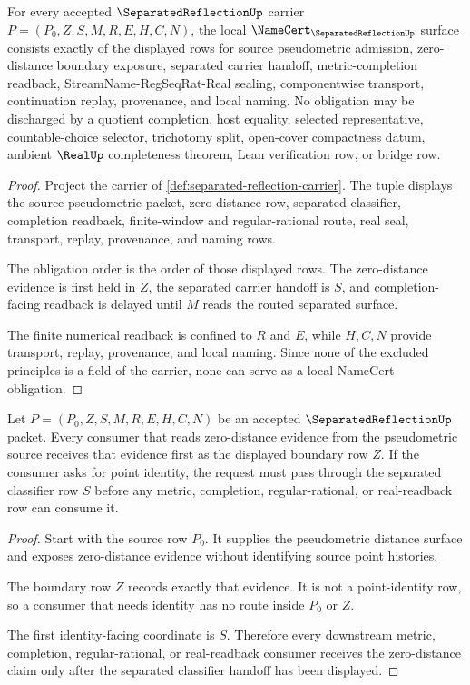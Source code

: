 \begin{theorem}
\label{thm:separated-reflection-namecert-obligations}
For every accepted $\SeparatedReflectionUp$ carrier $P=(P_0,Z,S,M,R,E,H,C,N)$, the local $\NameCert_{\SeparatedReflectionUp}$ surface consists exactly of the displayed rows for source pseudometric admission, zero-distance boundary exposure, separated carrier handoff, metric-completion readback, StreamName-RegSeqRat-Real sealing, componentwise transport, continuation replay, provenance, and local naming. No obligation may be discharged by a quotient completion, host equality, selected representative, countable-choice selector, trichotomy split, open-cover compactness datum, ambient $\RealUp$ completeness theorem, Lean verification row, or bridge row.
\end{theorem}
\begin{proof}
Project the carrier of \autoref{def:separated-reflection-carrier}. The tuple displays the source pseudometric packet, zero-distance row, separated classifier, completion readback, finite-window and regular-rational route, real seal, transport, replay, provenance, and naming rows.

The obligation order is the order of those displayed rows. The zero-distance evidence is first held in $Z$, the separated carrier handoff is $S$, and completion-facing readback is delayed until $M$ reads the routed separated surface.

The finite numerical readback is confined to $R$ and $E$, while $H,C,N$ provide transport, replay, provenance, and local naming. Since none of the excluded principles is a field of the carrier, none can serve as a local NameCert obligation.
\end{proof}

\begin{theorem}
\label{thm:separated-reflection-zero-distance-boundary}
Let $P=(P_0,Z,S,M,R,E,H,C,N)$ be an accepted $\SeparatedReflectionUp$ packet. Every consumer that reads zero-distance evidence from the pseudometric source receives that evidence first as the displayed boundary row $Z$. If the consumer asks for point identity, the request must pass through the separated classifier row $S$ before any metric, completion, regular-rational, or real-readback row can consume it.
\end{theorem}
\begin{proof}
Start with the source row $P_0$. It supplies the pseudometric distance surface and exposes zero-distance evidence without identifying source point histories.

The boundary row $Z$ records exactly that evidence. It is not a point-identity row, so a consumer that needs identity has no route inside $P_0$ or $Z$.

The first identity-facing coordinate is $S$. Therefore every downstream metric, completion, regular-rational, or real-readback consumer receives the zero-distance claim only after the separated classifier handoff has been displayed.
\end{proof}

